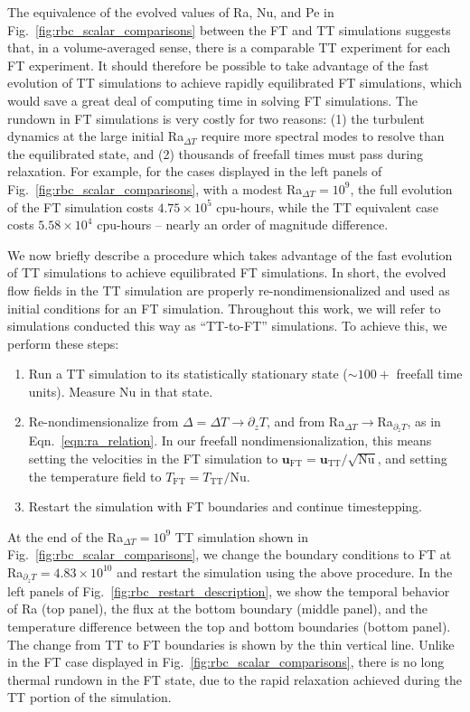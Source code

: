 \documentclass[aps, pre, onecolumn, nofootinbib, notitlepage, groupedaddress, amsfonts, amssymb, amsmath, longbibliography, superscriptaddress]{revtex4-1}
\begin{document}
The equivalence of the evolved values of Ra, Nu, and Pe in Fig.~\ref{fig:rbc_scalar_comparisons} between the FT and TT simulations suggests that, in a volume-averaged sense, there is a comparable TT experiment for each FT experiment.
It should therefore be possible to take advantage of the fast evolution of TT simulations to achieve rapidly equilibrated FT simulations, which would save a great deal of computing time in solving FT simulations.
The rundown in FT simulations is very costly for two reasons: (1) the turbulent dynamics at the large initial Ra$_{\Delta T}$ require more spectral modes to resolve than the equilibrated state, and (2) thousands of freefall times must pass during relaxation.
For example, for the cases displayed in the left panels of Fig.~\ref{fig:rbc_scalar_comparisons}, with a modest Ra$_{\Delta T} = 10^9$, the full evolution of the FT simulation costs $4.75 \times 10^5$ cpu-hours, while the TT equivalent case costs $5.58 \times 10^4$ cpu-hours -- nearly an order of magnitude difference.

We now briefly describe a procedure which takes advantage of the fast evolution of TT simulations to achieve equilibrated FT simulations.
In short, the evolved flow fields in the TT simulation are properly re-nondimensionalized and used as initial conditions for an FT simulation.
Throughout this work, we will refer to simulations conducted this way as ``TT-to-FT'' simulations.
To achieve this, we perform these steps:
\begin{enumerate}
\item Run a TT simulation to its statistically stationary state ($\sim100+$ freefall time units). 
Measure $\text{Nu}$ in that state.
\item Re-nondimensionalize from $\Delta = \Delta T \rightarrow \partial_z T$, and from Ra$_{\Delta T}\rightarrow$Ra$_{\partial_z T}$, as in Eqn.~\ref{eqn:ra_relation}.
In our freefall nondimensionalization, this means setting the velocities in the FT simulation to $\bm{u}_{\text{FT}} = \bm{u}_{\text{TT}} / \sqrt{\text{Nu}}$, and setting the temperature field to $T_{\text{FT}} = T_{\text{TT}} / \text{Nu}$.
\item Restart the simulation with FT boundaries and continue timestepping.
\end{enumerate}
At the end of the Ra$_{\Delta T} = 10^9$ TT simulation shown in Fig.~\ref{fig:rbc_scalar_comparisons}, we change the boundary conditions to FT at Ra$_{\partial_z T} = 4.83\times 10^{10}$ and restart the simulation using the above procedure.
In the left panels of Fig.~\ref{fig:rbc_restart_description}, we show the temporal behavior of Ra (top panel), the flux at the bottom boundary (middle panel), and the temperature difference between the top and bottom boundaries (bottom panel).
The change from TT to FT boundaries is shown by the thin vertical line.
Unlike in the FT case displayed in Fig.~\ref{fig:rbc_scalar_comparisons}, there is no long thermal rundown in the FT state, due to the rapid relaxation achieved during the TT portion of the simulation.
\end{document}

